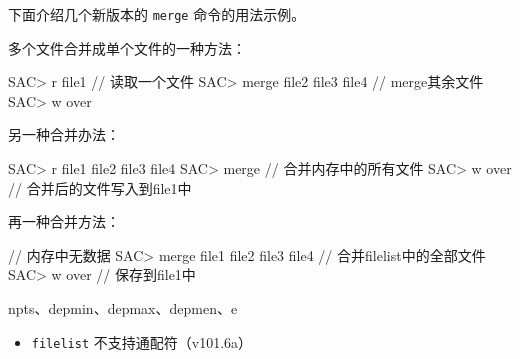 下面介绍几个新版本的 \texttt{merge} 命令的用法示例。

多个文件合并成单个文件的一种方法：
\begin{SACCode}
SAC> r file1                        // 读取一个文件
SAC> merge file2 file3 file4        // merge其余文件
SAC> w over
\end{SACCode}

另一种合并办法：
\begin{SACCode}
SAC> r file1 file2 file3 file4
SAC> merge                      // 合并内存中的所有文件
SAC> w over                     // 合并后的文件写入到file1中
\end{SACCode}

再一种合并方法：
\begin{SACCode}
                                    // 内存中无数据
SAC> merge file1 file2 file3 file4  // 合并filelist中的全部文件
SAC> w over                         // 保存到file1中
\end{SACCode}

npts、depmin、depmax、depmen、e

\begin{itemize}
\item \texttt{filelist} 不支持通配符（v101.6a）
\end{itemize}
